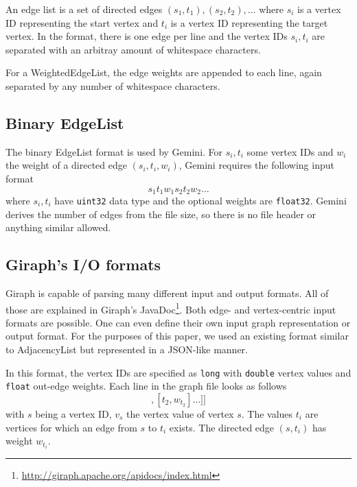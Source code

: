 An edge list is a set of directed edges $(s_1,t_1),(s_2,t_2),\ldots$ where $s_i$ is a vertex ID representing the start vertex and $t_i$ is a vertex ID representing the target vertex.
In the format, there is one edge per line and the vertex IDs $s_i, t_i$ are separated with an arbitray amount of whitespace characters.

For a WeightedEdgeList, the edge weights are appended to each line, again separated by any number of whitespace characters.

\subsection{Binary EdgeList}
The binary EdgeList format is used by Gemini.
For $s_i, t_i$ some vertex IDs and $w_i$ the weight of a directed edge $(s_i,t_i, w_i)$, Gemini requires the following input format
\begin{equation*}
	s_1t_1w_1s_2t_2w_2\ldots
\end{equation*}
where $s_i,t_i$ have \texttt{uint32} data type and the optional weights are \texttt{float32}.
Gemini derives the number of edges from the file size, so there is no file header or anything similar allowed.

\subsection{Giraph's I/O formats}
Giraph is capable of parsing many different input and output formats. All of those are explained in Giraph's JavaDoc\footnote{\url{http://giraph.apache.org/apidocs/index.html}}.
Both edge- and vertex-centric input formats are possible.
One can even define their own input graph representation or output format. For the purposes of this paper, we used an existing format similar to AdjacencyList but represented in a JSON-like manner.

In this format, the vertex IDs are specified as \texttt{long} with \texttt{double} vertex values and \texttt{float} out-edge weights.
Each line in the graph file looks as follows
\begin{equation*}
	[s,v_s,[[t_1, w_{t_1}], [t_2, w_{t_2}]...]]
\end{equation*}
with $s$ being a vertex ID, $v_s$ the vertex value of vertex $s$. The values $t_i$ are vertices for which an edge from $s$ to $t_i$ exists. The directed edge $(s,t_i)$ has weight $w_{t_i}$.
